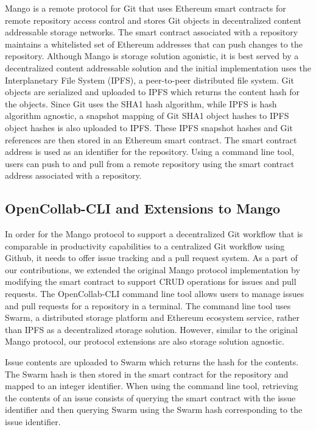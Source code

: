 Mango is a remote protocol for Git that uses Ethereum smart contracts for remote
repository access control and stores Git objects in decentralized content addressable storage
networks\cite{mango}. The smart contract associated with a repository maintains
a whitelisted set of Ethereum addresses that can push changes to the repository. Although Mango is storage solution agonistic, it is best
served by a decentralized content addressable solution and the initial
implementation uses the Interplanetary File System (IPFS), a peer-to-peer
distributed file system\cite{ipfs}. Git objects are serialized and uploaded to
IPFS which returns the content hash for the objects. Since Git uses the SHA1
hash algorithm, while IPFS is hash algorithm agnostic, a snapshot mapping of Git
SHA1 object hashes to IPFS object hashes is also uploaded to
IPFS\cite{mangoTech}. These IPFS snapshot hashes and Git references are then
stored in an Ethereum smart contract. The smart contract address is used as an
identifier for the repository. Using a command line tool, users can push to and
pull from a remote repository using the smart contract address associated with a repository.

\subsection{OpenCollab-CLI and Extensions to Mango}

In order for the Mango protocol to support a decentralized Git workflow that is
comparable in productivity capabilities to a centralized Git workflow using Github, it
needs to offer issue tracking and a pull request system. As a part of our contributions, we
extended the original Mango protocol implementation by modifying the
 smart contract to support CRUD operations for issues and
pull requests. The OpenCollab-CLI command line tool allows users to manage
issues and pull requests for a repository in a terminal. The command line tool uses Swarm, a distributed storage platform and Ethereum
ecosystem service, rather than IPFS as a decentralized storage
solution\cite{swarm}. However, similar to the original Mango protocol, our
protocol extensions are also storage solution agnostic.

Issue contents are uploaded to Swarm which returns the hash for the contents.
The Swarm hash is then stored in the smart contract for the repository and
mapped to an integer identifier. When using the command line tool, retrieving the contents of an issue consists of
querying the smart contract with the issue identifier and then querying Swarm
using the Swarm hash corresponding to the issue identifier.

